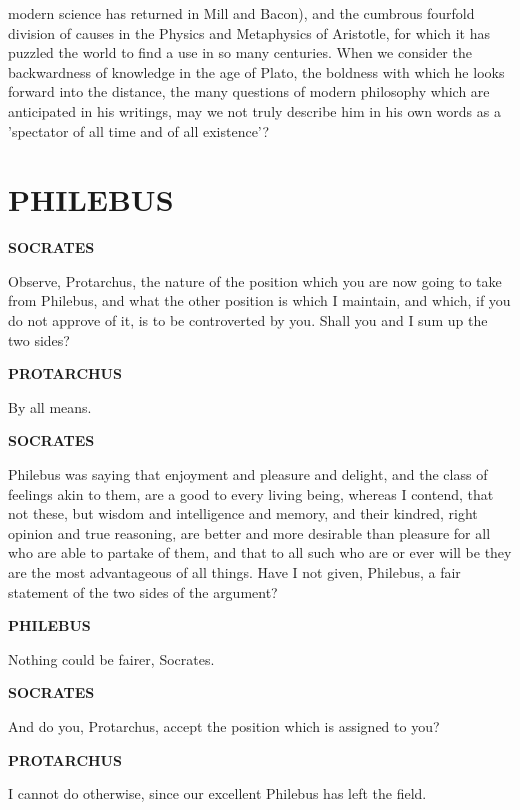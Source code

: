 \documentclass[11pt,letter]{article}
\begin{document}
modern science has returned in Mill and Bacon), and the cumbrous fourfold division of causes in the Physics and Metaphysics of Aristotle, for which it has puzzled the world to find a use in so many centuries. When we consider the backwardness of knowledge in the age of Plato, the boldness with which he looks forward into the distance, the many questions of modern philosophy which are anticipated in his writings, may we not truly describe him in his own words as a 'spectator of all time and of all existence'?

\par 
\section{
      PHILEBUS
    } 
\par \textbf{SOCRATES}
\par   Observe, Protarchus, the nature of the position which you are now going to take from Philebus, and what the other position is which I maintain, and which, if you do not approve of it, is to be controverted by you. Shall you and I sum up the two sides?

\par \textbf{PROTARCHUS}
\par   By all means.

\par \textbf{SOCRATES}
\par   Philebus was saying that enjoyment and pleasure and delight, and the class of feelings akin to them, are a good to every living being, whereas I contend, that not these, but wisdom and intelligence and memory, and their kindred, right opinion and true reasoning, are better and more desirable than pleasure for all who are able to partake of them, and that to all such who are or ever will be they are the most advantageous of all things. Have I not given, Philebus, a fair statement of the two sides of the argument?

\par \textbf{PHILEBUS}
\par   Nothing could be fairer, Socrates.

\par \textbf{SOCRATES}
\par   And do you, Protarchus, accept the position which is assigned to you?

\par \textbf{PROTARCHUS}
\par   I cannot do otherwise, since our excellent Philebus has left the field.
\end{document}
